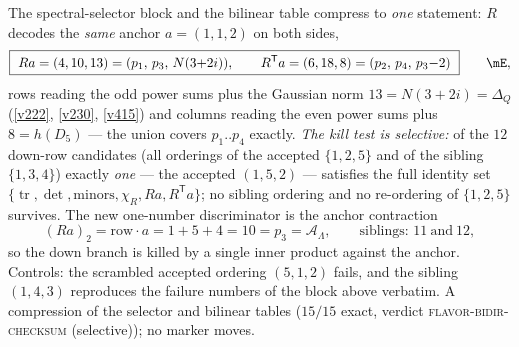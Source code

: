 \documentclass[11pt,a4paper]{article}
\newcommand{\AL}{\mathcal A_\Lambda}
\theoremstyle{definition}
\begin{document}
\begin{keybox}
The spectral-selector block and the bilinear table compress to \emph{one} statement: $R$ decodes the
\emph{same} anchor $a=(1,1,2)$ on both sides,
\[
  \boxed{\ Ra=(4,10,13)=(p_1,\,p_3,\,N(3{+}2i)),\qquad
  R^{\mathsf T}a=(6,18,8)=(p_2,\,p_4,\,p_3{-}2)\ }\qquad\mE ,
\]
rows reading the odd power sums plus the Gaussian norm $13=N(3{+}2i)=\Delta_Q$ (\vref{v222},
\vref{v230}, \vref{v415}) and columns reading the even power sums plus $8=h(D_5)$ --- the union covers
$p_1..p_4$ exactly.  \emph{The kill test is selective:} of the $12$ down-row candidates (all orderings
of the accepted $\{1,2,5\}$ and of the sibling $\{1,3,4\}$) exactly \emph{one} --- the accepted
$(1,5,2)$ --- satisfies the full identity set $\{\operatorname{tr},\det,\text{minors},\chi_R,Ra,
R^{\mathsf T}a\}$; no sibling ordering and no re-ordering of $\{1,2,5\}$ survives.  The new
one-number discriminator is the anchor contraction
\[
  (Ra)_2=\text{row}\cdot a=1{+}5{+}4=10=p_3=\AL,\qquad\text{siblings: }11\ \text{and}\ 12 ,
\]
so the down branch is killed by a single inner product against the anchor.  Controls: the scrambled
accepted ordering $(5,1,2)$ fails, and the sibling $(1,4,3)$ reproduces the failure numbers of the
block above verbatim.  A compression of the selector and bilinear tables ($15/15$ exact, verdict
\textsc{flavor-bidir-checksum} (selective)); no marker moves.
\end{keybox}
\end{document}
